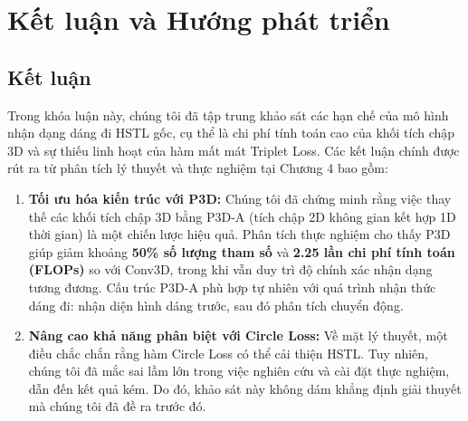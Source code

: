 \chapter{Kết luận và Hướng phát triển}
\label{Chapter5}

\section{Kết luận}

Trong khóa luận này, chúng tôi đã tập trung khảo sát các hạn chế của mô hình nhận dạng dáng đi HSTL gốc, cụ thể là chi phí tính toán cao của khối tích chập 3D và sự thiếu linh hoạt của hàm mất mát Triplet Loss. Các kết luận chính được rút ra từ phân tích lý thuyết và thực nghiệm tại Chương 4 bao gồm:

\begin{enumerate}
      \item \textbf{Tối ưu hóa kiến trúc với P3D:}
            Chúng tôi đã chứng minh rằng việc thay thế các khối tích chập 3D bằng P3D-A (tích chập 2D không gian kết hợp 1D thời gian) là một chiến lược hiệu quả. Phân tích thực nghiệm cho thấy P3D giúp giảm khoảng \textbf{50\% số lượng tham số} và \textbf{2.25 lần chi phí tính toán (FLOPs)} so với Conv3D, trong khi vẫn duy trì độ chính xác nhận dạng tương đương. Cấu trúc P3D-A phù hợp tự nhiên với quá trình nhận thức dáng đi: nhận diện hình dáng trước, sau đó phân tích chuyển động.

      \item \textbf{Nâng cao khả năng phân biệt với Circle Loss:}
            Về mặt lý thuyết, một điều chắc chắn rằng hàm Circle Loss có thể cải thiện HSTL. Tuy nhiên, chúng tôi đã mắc sai lầm lớn trong việc nghiên cứu và cài đặt thực nghiệm, dẫn đến kết quả kém. Do đó, khảo sát này không dám khẳng định giải thuyết mà chúng tôi đã đề ra trước đó.
\end{enumerate}

